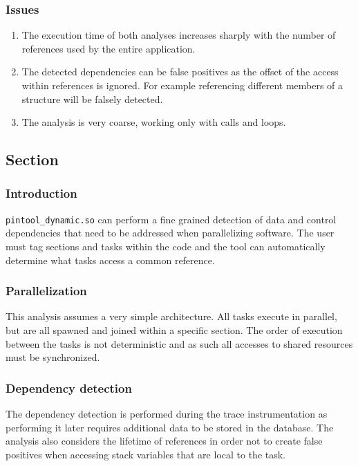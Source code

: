 \subsubsection{Issues}

\begin{enumerate}
	\item The execution time of both analyses increases sharply with the number of references used by the entire application.
	\item The detected dependencies can be false positives as the offset of the access within references is ignored. For example referencing different members of a structure will be falsely detected.
	\item The analysis is very coarse, working only with calls and loops.
\end{enumerate}

\subsection{Section}

\subsubsection{Introduction}

\texttt{pintool\_dynamic.so} can perform a fine grained detection of data and control dependencies that need to be addressed when parallelizing software. The user must tag sections and tasks within the code and the tool can automatically determine what tasks access a common reference.

\subsubsection{Parallelization}

This analysis assumes a very simple architecture. All tasks execute in parallel, but are all spawned and joined within a specific section. The order of execution between the tasks is not deterministic and as such all accesses to shared resources must be synchronized.

\subsubsection{Dependency detection}

The dependency detection is performed during the trace instrumentation as performing it later requires additional data to be stored in the database. The analysis also considers the lifetime of references in order not to create false positives when accessing stack variables that are local to the task.

